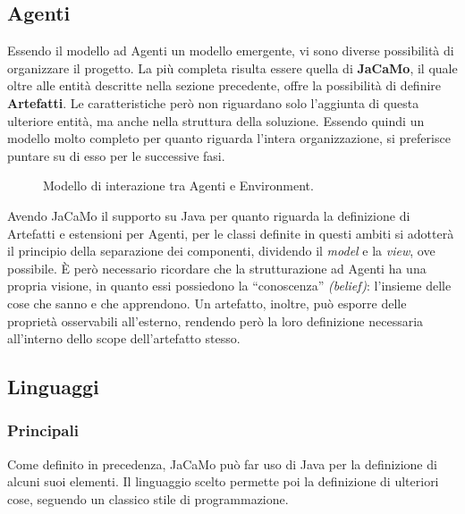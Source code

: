 \documentclass[12pt,a4paper,openright,oneside]{report}
\newcommand{\quotes}[1]{``#1''}
\begin{document}
\subsection{Agenti}
Essendo il modello ad Agenti un modello emergente, vi sono diverse possibilità di organizzare il progetto. La più completa risulta essere quella di \textbf{JaCaMo}, il quale oltre alle entità descritte nella sezione precedente, offre la possibilità di definire \textbf{Artefatti}. Le caratteristiche però non riguardano solo l'aggiunta di questa ulteriore entità, ma anche nella struttura della soluzione. Essendo quindi un modello molto completo per quanto riguarda l'intera organizzazione, si preferisce puntare su di esso per le successive fasi.\\

\begin{figure}[h]
	\centering
	\caption{Modello di interazione tra Agenti e Environment.}
	\label{fig:jacamo}
\end{figure}

Avendo JaCaMo il supporto su Java per quanto riguarda la definizione di Artefatti e estensioni per Agenti, per le classi definite in questi ambiti si adotterà il principio della separazione dei componenti, dividendo il \textit{model} e la \textit{view}, ove possibile. È però necessario ricordare che la strutturazione ad Agenti ha una propria visione, in quanto essi possiedono la \quotes{conoscenza} \textit{(belief)}: l'insieme delle cose che sanno e che apprendono. Un artefatto, inoltre, può esporre delle proprietà osservabili all'esterno, rendendo però la loro definizione necessaria all'interno dello scope dell'artefatto stesso.

\subsection{Linguaggi}

\subsubsection{Principali}
Come definito in precedenza, JaCaMo può far uso di Java per la definizione di alcuni suoi elementi. Il linguaggio scelto permette poi la definizione di ulteriori cose, seguendo un classico stile di programmazione.\\
\end{document}
